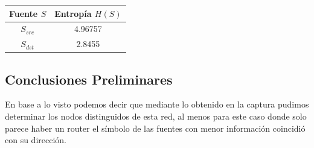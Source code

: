 \begin{center}
\begin{tabular}{|c|c|}
\hline
Fuente $S$ & Entropía $H(S)$\\
\hline
$S_{src}$ & 4.96757\\
$S_{dst}$ & 2.8455\\
\hline
\end{tabular}
\end{center}

\subsection{Conclusiones Preliminares}

\par En base a lo visto podemos decir que mediante lo obtenido en la captura pudimos determinar los nodos distinguidos de esta red, al menos para este caso donde solo parece haber un router el símbolo de las fuentes con menor información coincidió con su dirección.
